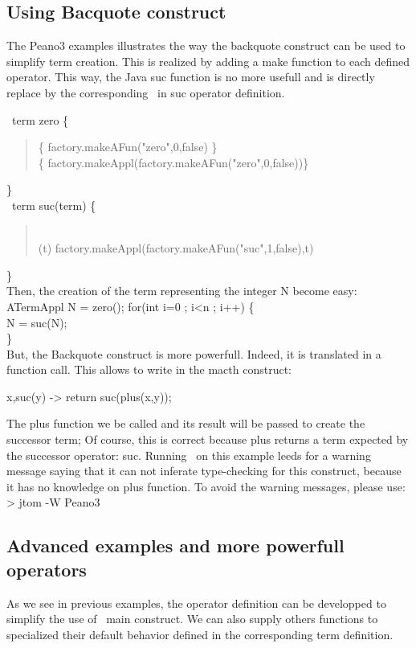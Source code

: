 \subsection{Using Bacquote construct}
The Peano3 examples illustrates the way the backquote construct can be
used to simplify term creation. This is realized by adding a
\textsf{make} function to each defined operator. This way, the Java suc
function is no more usefull and is directly replace by the
corresponding \make\ in suc operator definition. 

\op\ term zero \{\\
\begin{quote}
  \fsym \{ factory.makeAFun("zero",0,false) \}\\
  \make \{ factory.makeAppl(factory.makeAFun("zero",0,false))\}\\
\end{quote}
\}\\
  
\op\ term suc(term) \{\\
\begin{quote}
 \\
 \make(t) { factory.makeAppl(factory.makeAFun("suc",1,false),t) }\\
\end{quote}
\}\\

Then, the creation of the term representing the integer N become easy:\\
ATermAppl N = \backquote zero();
for(int i=0 ; i<n ; i++) \{\\
  N = \backquote suc(N);\\
\}\\

But, the Backquote construct is more powerfull. Indeed, it is
translated in a function call. This allows to write in the macth
construct:

x,suc(y) -> { return \backquote suc(plus(x,y)); }

The plus function we be called and its result will be passed to create
the successor term; Of course, this is correct because plus returns a
term expected by the successor operator: suc. Running \TOM\ on this
example leeds for a warning message saying that it can not inferate
type-checking for this construct, because it has no knowledge on plus
function. To avoid the warning messages, please use:
\\> jtom -W Peano3

\subsection{Advanced examples and more powerfull operators}
As we see in previous examples, the operator definition can be
developped to simplify the use of \TOM\ main construct. We can also
supply others functions to specialized their default behavior defined
in the corresponding term definition.


